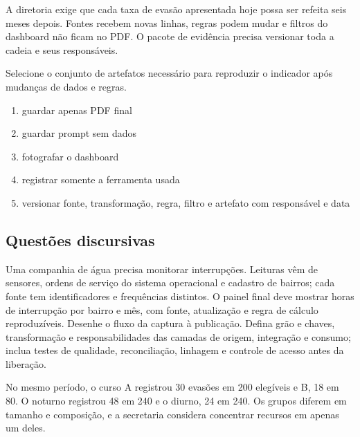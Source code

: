 \TextoBase

A diretoria exige que cada taxa de evasão apresentada hoje possa ser refeita seis meses depois. Fontes recebem novas linhas, regras podem mudar e filtros do dashboard não ficam no PDF. O pacote de evidência precisa versionar toda a cadeia e seus responsáveis.

\FonteDidatica

\Comando Selecione o conjunto de artefatos necessário para reproduzir o indicador após mudanças de dados e regras.

\begin{enumerate}[label=\Alph*)]

\item guardar apenas PDF final

\item guardar prompt sem dados

\item fotografar o dashboard

\item registrar somente a ferramenta usada

\item versionar fonte, transformação, regra, filtro e artefato com responsável e data

\end{enumerate}

\subsection{Questões discursivas}

\TextoBase Uma companhia de água precisa monitorar interrupções. Leituras vêm de sensores, ordens de serviço do sistema operacional e cadastro de bairros; cada fonte tem identificadores e frequências distintos. O painel final deve mostrar horas de interrupção por bairro e mês, com fonte, atualização e regra de cálculo reproduzíveis.
\FonteDidatica
\Comando Desenhe o fluxo da captura à publicação. Defina grão e chaves, transformação e responsabilidades das camadas de origem, integração e consumo; inclua testes de qualidade, reconciliação, linhagem e controle de acesso antes da liberação.

\TextoBase

No mesmo período, o curso A registrou 30 evasões em 200 elegíveis e B, 18 em 80. O noturno registrou 48 em 240 e o diurno, 24 em 240. Os grupos diferem em tamanho e composição, e a secretaria considera concentrar recursos em apenas um deles.

